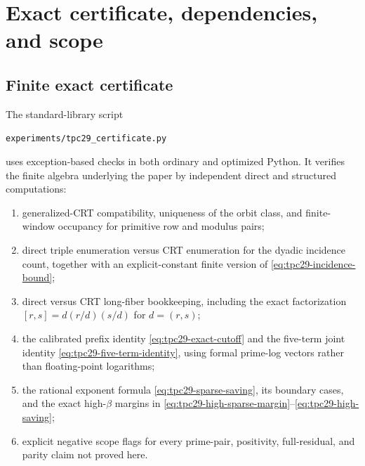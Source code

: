 \section{Exact certificate, dependencies, and scope}
\label{sec:tpc29-certificate-scope}

\subsection{Finite exact certificate}

The standard-library script
\begin{center}
\texttt{experiments/tpc29\_certificate.py}
\end{center}
uses exception-based checks in both ordinary and optimized Python.  It
verifies the finite algebra underlying the paper by independent direct
and structured computations:

\begin{enumerate}[label=\textup{(\roman*)}]
 \item generalized-CRT compatibility, uniqueness of the orbit class,
 and finite-window occupancy for primitive row and modulus pairs;
 \item direct triple enumeration versus CRT enumeration for the
 dyadic incidence count, together with an explicit-constant finite
 version of \eqref{eq:tpc29-incidence-bound};
 \item direct versus CRT long-fiber bookkeeping, including the exact
 factorization $[r,s]=d(r/d)(s/d)$ for $d=(r,s)$;
 \item the calibrated prefix identity
 \eqref{eq:tpc29-exact-cutoff} and the five-term joint identity
 \eqref{eq:tpc29-five-term-identity}, using formal prime-log vectors
 rather than floating-point logarithms;
 \item the rational exponent formula
 \eqref{eq:tpc29-sparse-saving}, its boundary cases, and the exact
 high-$\beta$ margins in
 \eqref{eq:tpc29-high-sparse-margin}--\eqref{eq:tpc29-high-saving};
 \item explicit negative scope flags for every prime-pair, positivity,
 full-residual, and parity claim not proved here.
\end{enumerate}

